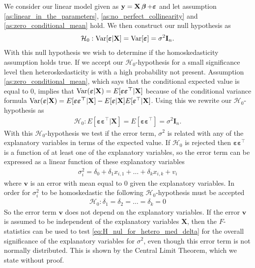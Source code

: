 We consider our linear model given as $\textbf{y} = \textbf{X} \operatorname{\boldsymbol{\beta}} + \boldsymbol{\varepsilon}$ and let assumption \ref{as:linear_in_the_parameters}, \ref{as:no_perfect_collinearity} and \ref{as:zero_conditional_mean} hold. We then construct our null hypothesis as
\begin{align*}
    \mathcal{H}_0 : \operatorname{\text{Var}}[\boldsymbol{\varepsilon} | \mathbf{X}] = \operatorname{\text{Var}}[\boldsymbol{\varepsilon}] = \sigma^2 \textbf{I}_n. 
\end{align*}
With this null hypothesis we wish to determine if the homoskedasticity assumption holds true. 
If we accept our $\mathcal{H}_0$-hypothesis for a small significance level then heteroskedasticity is with a high probability not present.
Assumption \ref{as:zero_conditional_mean}, which says that the conditional expected value is equal to $0$, implies that $\operatorname{\text{Var}}(\boldsymbol{\varepsilon} | \mathbf{X}) = E[\boldsymbol{\varepsilon \varepsilon^\top} | \mathbf{X}]$ because of the conditional variance formula $\operatorname{\text{Var}}(\boldsymbol{\varepsilon} | \mathbf{X}) = E[\boldsymbol{\varepsilon \varepsilon^\top} | \mathbf{X}] - E[\boldsymbol{\varepsilon} | \mathbf{X}]E[\boldsymbol{\varepsilon}^\top | \mathbf{X}]$. 
Using this we rewrite our $\mathcal{H}_0$-hypothesis as
\begin{align*}
    \mathcal{H}_0 : E[\boldsymbol{\varepsilon \varepsilon^\top} | \mathbf{X}] = E[\boldsymbol{\varepsilon \varepsilon^\top}] = \sigma^2\textbf{I}_n.
\end{align*}
With this $\mathcal{H}_0$-hypothesis we test if the error term, $\sigma^2$ is related with any of the explanatory variables in terms of the expected value.  
If $\mathcal{H}_0$ is rejected then $\boldsymbol{\varepsilon \varepsilon^\top}$ is a function of at least one of the explanatory variables, so the error term can be expressed as a linear function of these explanatory variables
\begin{align}\label{eq:test_hetero_nul_hypotese}
    \sigma_i^2 = \delta_0 + \delta_1x_{i,1} + \ldots + \delta_kx_{i,k} + v_i
\end{align}
where $\textbf{v}$ is an error with mean equal to $0$ given the explanatory variables. In order for $\sigma_i^2$ to be homoskedastic the following $\mathcal{H}_0$-hypothesis must be accepted 
\begin{align}\label{eq:H_nul_for_hetero_med_delta}
    \mathcal{H}_0 : \delta_1 = \delta_2 = \ldots = \delta_k = 0
\end{align}
So the error term $\textbf{v}$ does not depend on the explanatory variables. 
If the error $\textbf{v}$ is assumed to be independent of the explanatory variables $\mathbf{X}$, then the $F$-statistics can be used to test \eqref{eq:H_nul_for_hetero_med_delta} for the overall significance of the explanatory variables for $\sigma^2$, even though this error term is not normally distributed. This is shown by the Central Limit Theorem, which we state without proof. 
